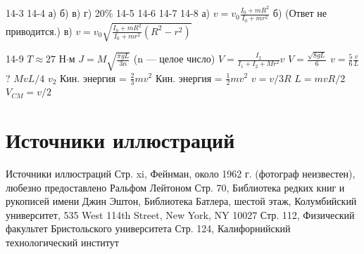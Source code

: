 \documentclass[10pt,oneside]{article}
\begin{document}
14-3 14-4 а) б) в) г) 20\% 14-5 14-6 14-7 14-8 а) \(v = v_0 \frac{I_0 + mR^2}{I_0 + mr^2}\) б) (Ответ не приводится.) в) \(v = v_0 \sqrt{\frac{I_0 + mR^2}{I_0 + mr^2} (R^2 - r^2)}\)\par

14-9 \(T \approx 27\) Н\ensuremath{\cdot}м \(J = M \sqrt{\frac{\pi g L}{3 n}}\) (n --- целое число) \(V = \frac{I_2}{I_1 + I_2 + Mr^2} v\) \(V = \frac{\sqrt{8gL}}{6}\) \(v = \frac{5}{6} \frac{v}{L}\)? \(MvL/4\) \(v_2\) Кин. энергия = \(\frac{2}{3} mv^2\) Кин. энергия = \(\frac{1}{2} mv^2\) \(v = v/3R\) \(L = mvR/2\) \(V_{CM} = v/2\)\par

\clearpage
{}
\section*{Источники иллюстраций}
\label{tips-sec-14-источники-иллюстраций}
Источники иллюстраций Стр. xi, Фейнман, около 1962 г. (фотограф неизвестен), любезно предоставлено Ральфом Лейтоном Стр. 70, Библиотека редких книг и рукописей имени Джин Эштон, Библиотека Батлера, шестой этаж, Колумбийский университет, 535 West 114th Street, New York, NY 10027 Стр. 112, Физический факультет Бристольского университета Стр. 124, Калифорнийский технологический институт\par

\clearpage
{}
\end{document}
